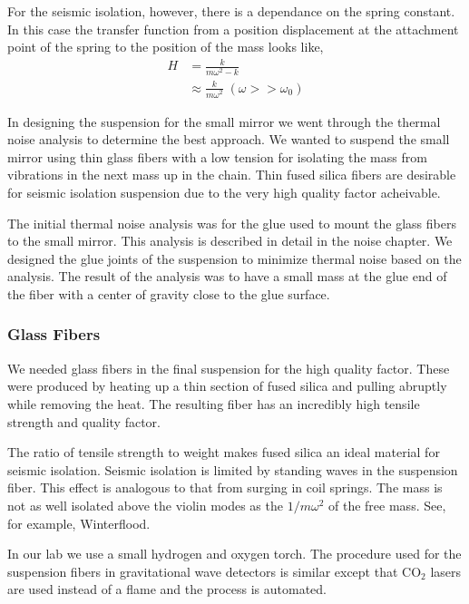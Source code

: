 For the seismic isolation, however, there is a dependance on the spring constant.
In this case the transfer function from a position displacement at the attachment
point of the spring to the position of the mass looks like,
\begin{align}
H &= \frac{k}{m\omega^2 - k} \\
  &\approx \frac{k}{m\omega^2} \; (\omega >> \omega_0)
\end{align}

In designing the suspension for the small mirror we went through the thermal
noise analysis to determine the best approach. We wanted to suspend the small
mirror using thin glass fibers with a low tension for isolating the mass from
vibrations in the next mass up in the chain.
Thin fused silica fibers are desirable for seismic isolation suspension due to
the very high quality factor acheivable. \cite{Ageev}

The initial thermal noise analysis was for the glue used to mount the glass
fibers to the small mirror. This analysis is described in detail in the
noise chapter. We designed the glue joints of the suspension to minimize
thermal noise based on the analysis. The result of the analysis was to have a
small mass at the glue end of the fiber with a center of gravity close to the
glue surface.

\subsubsection{Glass Fibers}

We needed glass fibers in the final suspension for the high quality factor.
These were produced by heating up a thin section of fused silica and pulling
abruptly while removing the heat.
The resulting fiber has an incredibly high tensile strength and quality factor.

The ratio of tensile strength to weight makes fused silica an ideal material
for seismic isolation.
Seismic isolation is limited by standing waves in the suspension fiber.
This effect is analogous to that from surging in coil springs.
The mass is not as well isolated above the violin modes as the $1/m\omega^2$
of the free mass.
See, for example, Winterflood\cite{0264-9381-19-7-355}.

In our lab we use a small hydrogen and oxygen torch.
The procedure used for the suspension fibers in gravitational wave detectors
is similar except that $\mathrm{CO}_2$ lasers are used instead of a flame
and the process is automated.

